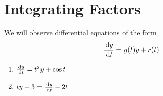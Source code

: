 \section{Integrating Factors}
We will observe differential equations of the form
\begin{equation}
  \frac{\,\mathrm{d} y}{\,\mathrm{d} t} = g(t) y + r(t)
\end{equation}
\begin{enumerate}
  \item $\frac{\,\mathrm{d} y}{\,\mathrm{d} t} = t^2 y + \cos{t}$
  \item $t y +3=\frac{\,\mathrm{d} y}{\,\mathrm{d} t}-2t$
\end{enumerate}
